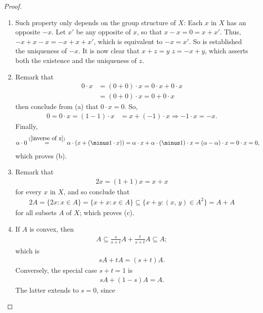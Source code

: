 \begin{proof}
\begin{enumerate}
\item Such property only depends on the group structure of $X$: Each $x$ in
$X$ has an opposite $\minus x$. Let $x'$ be any opposite of $x$, so that
${x-x=0}=x+x'$. %
Thus, $\minus x +x -x =  \minus x + x + x' $, %
which is equivalent to $\minus x = x'$. So is established the uniqueness of %
$\minus x $. %
%
It is now clear that $x+z=y$ \iif $z=\minus x +y$, %
which asserts both the existence and the uniqueness of $z$.
\item Remark that %
%
\begin{align}
  0\cdot x & =(0+0)\cdot x=0\cdot x+0\cdot x \\
           & =(0+0)\cdot x=0 +0\cdot x 
\end{align} 
%
then conclude from (a) that $0\cdot x=0$. So, %
\begin{align} \label{inverse of x}
  0=0\cdot x=(1-1)\cdot x &=x+(\minus 1)\cdot x
  \Rightarrow \minus 1\cdot x= \minus x.
\end{align}
%
Finally, %
%
\begin{align}
  \alpha\cdot 0\overset{(\ref{inverse of x})}{=}
  \alpha\cdot (x+(\minus 1\cdot x))
  = \alpha \cdot x + \alpha \cdot (\minus 1) \cdot x 
  = (\alpha-\alpha )  \cdot x =0\cdot x = 0,
\end{align}
%
which proves (b).
%
\item Remark that 
%
\begin{align}
  2x =(1+1) x = x + x
\end{align}
%
for every $x$ in $X$, and so conclude that %
%
\begin{align}\label{double lies in sum}
  2A = \{2x: x\in A \} 
  = \{x + x: x \in A \} 
  \subseteq \{ x + y : (x,\,y) \in A^2 \} 
  = A+A
\end{align}
%
for all subsets $A$ of $X$; which proves (c). %
\item If $A$ is convex, then %
%
\begin{align}
  A \subseteq \frac{s}{s+t} A + \frac{t}{s+t} A \subseteq A;
\end{align}
%
which is %
%
\begin{align}
  sA + tA = (s+t)A.
\end{align}
%
Conversely, the special case $s+t=1$ is %
%
\begin{align}
  sA + (1-s)A = A.
\end{align}
%
The latter extends to $s=0$, since %

\end{enumerate}
\end{proof}
